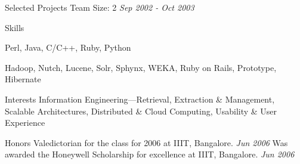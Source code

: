 \documentclass{resume}
\renewcommand{\labelcitem}{}
\newcommand{\period}{\hfill\small\sl}
\newcommand{\teamsize}{\sc\footnotesize Team Size: }
\begin{document}
\begin{category}{Selected Projects}
     {\teamsize 2} {\period Sep 2002 - Oct 2003}
    \begin{quotation}
    \end{quotation}

\end{category}


\begin{category}{Skills}

     Perl, Java, C/C++, Ruby, Python

     Hadoop, Nutch, Lucene, Solr, Sphynx, WEKA, Ruby on Rails, Prototype, Hibernate

\end{category}


\begin{category}{Interests}
    \citemnobullet Information Engineering---Retrieval, Extraction \& Management, Scalable Architectures, Distributed \& Cloud Computing, Usability \& User Experience
\end{category}


\renewcommand{\labelcitem}{$\diamond$}


\begin{category}{Honors}
    \citembullet Valedictorian for the class for 2006 at IIIT, Bangalore. {\period Jun 2006}
    \citembullet Was awarded the Honeywell Scholarship for excellence at IIIT, Bangalore. {\period Jun 2006}
\end{category}
\end{document}
